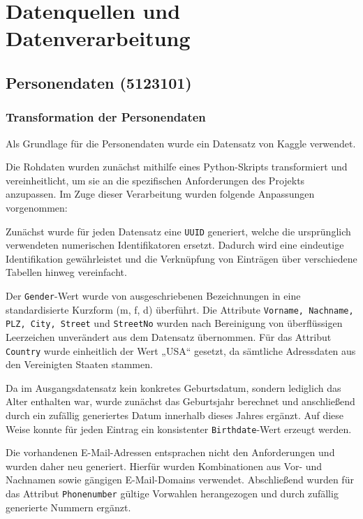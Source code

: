 \section{Datenquellen und Datenverarbeitung}

\subsection{Personendaten (5123101)}
\subsubsection{Transformation der Personendaten}
Als Grundlage für die Personendaten wurde ein Datensatz von Kaggle verwendet.\cite{swain_synthetic_person_data}

Die Rohdaten wurden zunächst mithilfe eines Python-Skripts transformiert und vereinheitlicht, um sie an die spezifischen Anforderungen des Projekts anzupassen. Im Zuge dieser Verarbeitung wurden folgende Anpassungen vorgenommen:

Zunächst wurde für jeden Datensatz eine \texttt{UUID} generiert, welche die ursprünglich verwendeten numerischen Identifikatoren ersetzt. Dadurch wird eine eindeutige Identifikation gewährleistet und die Verknüpfung von Einträgen über verschiedene Tabellen hinweg vereinfacht.

Der \texttt{Gender}-Wert wurde von ausgeschriebenen Bezeichnungen in eine standardisierte Kurzform (m, f, d) überführt. Die Attribute \texttt{Vorname, Nachname, PLZ, City, Street} und \texttt{StreetNo} wurden nach Bereinigung von überflüssigen Leerzeichen unverändert aus dem Datensatz übernommen. Für das Attribut \texttt{Country} wurde einheitlich der Wert „USA“ gesetzt, da sämtliche Adressdaten aus den Vereinigten Staaten stammen.

Da im Ausgangsdatensatz kein konkretes Geburtsdatum, sondern lediglich das Alter enthalten war, wurde zunächst das Geburtsjahr berechnet und anschließend durch ein zufällig generiertes Datum innerhalb dieses Jahres ergänzt. Auf diese Weise konnte für jeden Eintrag ein konsistenter \texttt{Birthdate}-Wert erzeugt werden.

Die vorhandenen E-Mail-Adressen entsprachen nicht den Anforderungen und wurden daher neu generiert. Hierfür wurden Kombinationen aus Vor- und Nachnamen sowie gängigen E-Mail-Domains verwendet. Abschließend wurden für das Attribut \texttt{Phonenumber} gültige Vorwahlen herangezogen und durch zufällig generierte Nummern ergänzt.

